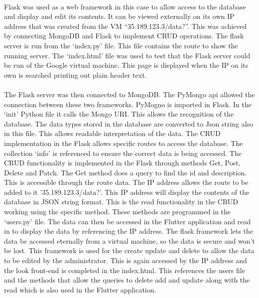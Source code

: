 \paragraph{}Flask was used as a web framework in this case to allow access to the database and display and edit its contents. It can be viewed externally on its own IP address that was created from the VM “35.189.123.3/data?”. This was achieved by connecting MongoDB and Flask to implement CRUD operations. The flask server is run from the ‘index.py’ file. This file contains the route to show the running server. The ‘index.html’ file was used to test that the Flask server could be run of the Google virtual machine. This page is displayed when the IP on its own is searched printing out plain header text. 
\paragraph{}The Flask server was then connected to MongoDB. The PyMongo api allowed the connection between these two frameworks. PyMogno is imported in Flask.  In the ‘init’ Python file it calls the Mongo URI. This allows the recognition of the database. The data types stored in the database are converted to Json string also in this file. This allows readable interpretation of the data. The CRUD implementation in the Flask allows specific routes to access the database. The collection ‘info’ is referenced to ensure the correct data is being accessed. The CRUD functionality is implemented in the Flask through methods Get, Post, Delete and Patch. The Get method does a query to find the id and description. This is accessible through the route data. The IP address allows the route to be added to it ’35.189.123.3/data?’. This IP address will display the contents of the database in JSON string format. This is the read functionality in the CRUD working using the specific method. These methods are programmed in the ‘users.py’ file. The data can then be accessed in the Flutter application and read in to display the data by referencing the IP address. The flask framework lets the data be accessed eternally from a virtual machine, so the data is secure and won’t be lost. 
This framework is used for the create update and delete to allow the data to be edited by the administrator. This is again accessed by the IP address and the look front-end is completed in the index.html. This references the users file and the methods that allow the queries to delete add and update along with the read which is also used in the Flutter application.

